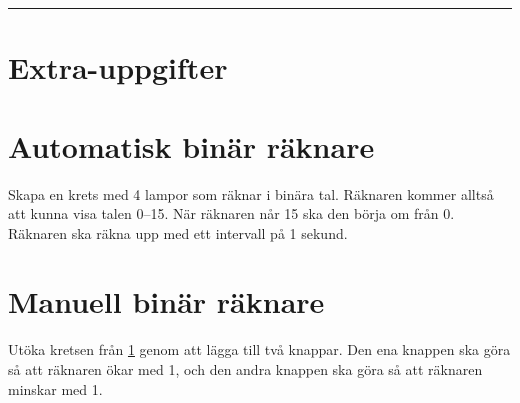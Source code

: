 \documentclass[11pt]{article}
\begin{document}
\vspace{4em}\hrule
\section*{Extra-uppgifter}

\section{Automatisk binär räknare}\label{sec:binar-raknare}
Skapa en krets med 4 lampor som räknar i binära tal. Räknaren kommer alltså att
kunna visa talen 0--15. När räknaren når 15 ska den börja om från 0. Räknaren
ska räkna upp med ett intervall på 1 sekund.

\section{Manuell binär räknare}\label{sec:manuell-binar-raknare}
Utöka kretsen från \ref{sec:binar-raknare} genom att lägga till två knappar.
Den ena knappen ska göra så att räknaren ökar med 1, och den andra knappen ska
göra så att räknaren minskar med 1.
\end{document}
